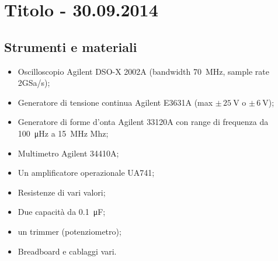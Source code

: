 \section{Titolo - 30.09.2014}

\subsection{Strumenti e materiali}

\begin{itemize} [noitemsep]
\item Oscilloscopio Agilent DSO-X 2002A (bandwidth \SI{70}{\mega\hertz}, sample rate 2GSa/s);
\item Generatore di tensione continua Agilent E3631A (max $\pm \, \SI{25}{\volt}$ o $\pm \, \SI{6}{\volt}$);
\item Generatore di forme d'onta Agilent 33120A con range di frequenza da \SI{100}{\micro\hertz} a \SI{15}{\mega\hertz} Mhz;
\item Multimetro Agilent 34410A;
\item Un amplificatore operazionale UA741;
\item Resistenze di vari valori;
\item Due capacità da \SI{0.1}{\micro\farad};
\item un trimmer (potenziometro);
\item Breadboard e cablaggi vari.
\end{itemize}